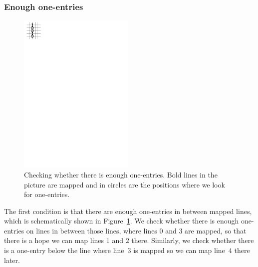 \subsubsection{Enough one-entries}
\begin{figure}[h!]
\centering
\includegraphics[width=55mm]{../img/enough_one-entries.pdf}
\caption{Checking whether there is enough one-entries. Bold lines in the picture are mapped and in circles are the positions where we look for one-entries.}
\label{enough}
\end{figure}
The first condition is that there are enough one-entries in between mapped lines, which is schematically shown in Figure~\ref{enough}. We check whether there is enough one-entries on lines in between those lines, where lines $0$ and $3$ are mapped, so that there is a hope we can map lines $1$ and $2$ there. Similarly, we check whether there is a one-entry below the line where line~$3$ is mapped so we can map line~$4$ there later.
